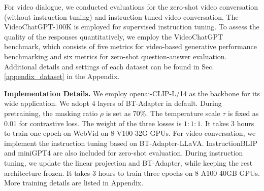 \documentclass{article} \usepackage{iclr2024_conference,times}
\begin{document}
For video dialogue, we conducted evaluations for the zero-shot video conversation (without instruction tuning) and instruction-tuned video conversation. The VideoChatGPT-100K \citep{maaz2023video} is employed for supervised instruction tuning. To assess the quality of the responses quantitatively, we employ the VideoChatGPT benchmark, which consists of five metrics for video-based generative performance benchmarking and six metrics for zero-shot question-answer evaluation. Additional details and settings of each dataset can be found in Sec. \ref{appendix_dataset} in the Appendix.

\noindent \textbf{Implementation Details.}
We employ openai-CLIP-L/14 as the backbone for its wide application. We adopt 4 layers of BT-Adapter in default. During pretraining, the masking ratio $\rho$ is set as 70\%. The temperature scale $\tau$ is fixed as 0.01 for contrastive loss. The weight of the three losses is $1:1:1$. It takes 3 hours to train one epoch on WebVid on 8 V100-32G GPUs. For video conversation, we implement the instruction tuning based on BT-Adapter-LLaVA. InstructionBLIP and miniGPT4 are also included for zero-shot evaluation. During instruction tuning, we update the linear projection and BT-Adapter, while keeping the rest architecture frozen. It takes 3 hours to train three epochs on 8 A100 40GB GPUs. More training details are listed in Appendix.
\end{document}
